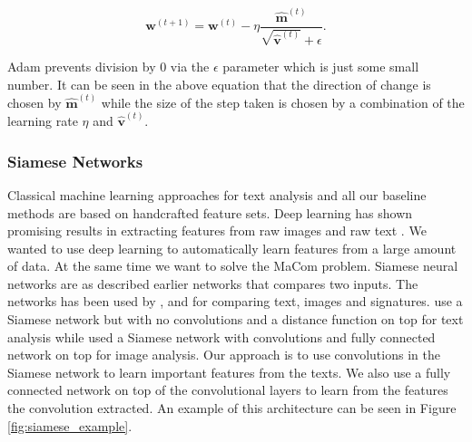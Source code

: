 \begin{description}
        \begin{equation}
            \mathbf{w}^{(t + 1)} = \mathbf{w}^{(t)} -
                \eta\frac
                    {\mathbf{\hat{m}}^{(t)}}
                    {\sqrt{\mathbf{\hat{v}}^{(t)}} + \epsilon}.
        \end{equation}

        \gls{Adam} prevents division by 0 via the $\epsilon$ parameter which is
        just some small number. It can be seen in the above equation that the
        direction of change is chosen by $\mathbf{\hat{m}}^{(t)}$ while the size
        of the step taken is chosen by a combination of the learning rate $\eta$
        and $\mathbf{\hat{v}}^{(t)}$.

\end{description}


\subsubsection{Siamese Networks}

Classical machine learning approaches for text analysis and all our baseline
methods are based on handcrafted feature sets. Deep learning has shown
promising results in extracting features from raw images and raw text
\cite{hongxiaosunyuan}. We wanted to use deep learning to automatically learn
features from a large amount of data. At the same time we want to solve the
MaCom problem. Siamese neural networks are as described earlier networks that
compares two inputs. The networks has been used by \cite{Koch2015SiameseNN},
\cite{NIPS1993_769} and \cite{qian:2018} for comparing text, images and
signatures. \cite{qian:2018} use a Siamese network but with no convolutions and
a distance function on top for text analysis while \cite{Koch2015SiameseNN}
used a Siamese network with convolutions and fully connected network on top
for image analysis. Our approach is to use convolutions in the Siamese network
to learn important features from the texts. We also use a fully connected
network on top of the convolutional layers to learn from the features the
convolution extracted. An example of this architecture can be seen in Figure
\ref{fig:siamese_example}.

